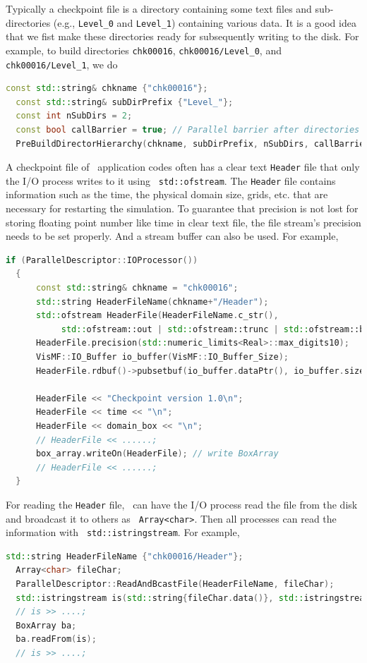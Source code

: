 {{Typically a checkpoint file is a directory containing some text files
and sub-directories (e.g., {\tt Level\_0} and {\tt Level\_1})
containing various data.  It is a good idea that we fist make these
directories ready for subsequently writing to the disk.  For example,
to build directories {\tt chk00016}, {\tt chk00016/Level\_0}, and {\tt
  chk00016/Level\_1}, we do
\begin{lstlisting}[language=cpp]
  const std::string& chkname {"chk00016"};
  const std::string& subDirPrefix {"Level_"};
  const int nSubDirs = 2;
  const bool callBarrier = true; // Parallel barrier after directories are built.
  PreBuildDirectorHierarchy(chkname, subDirPrefix, nSubDirs, callBarrier);
\end{lstlisting}

A checkpoint file of \amrex\ application codes often has a clear text
{\tt Header} file that only the I/O process writes to it using {\tt
std::ofstream}.  The {\tt Header} file contains information such as
the time, the physical domain size, grids, etc. that are necessary for
restarting the simulation.  To guarantee that precision is not lost
for storing floating point number like time in clear text file, the
file stream's precision needs to be set properly.  And a stream buffer
can also be used.  For example,
\begin{lstlisting}[language=cpp]
  if (ParallelDescriptor::IOProcessor())
  {
      const std::string& chkname = "chk00016";
      std::string HeaderFileName(chkname+"/Header");
      std::ofstream HeaderFile(HeaderFileName.c_str(),
           std::ofstream::out | std::ofstream::trunc | std::ofstream::binary);
      HeaderFile.precision(std::numeric_limits<Real>::max_digits10);
      VisMF::IO_Buffer io_buffer(VisMF::IO_Buffer_Size);
      HeaderFile.rdbuf()->pubsetbuf(io_buffer.dataPtr(), io_buffer.size());

      HeaderFile << "Checkpoint version 1.0\n";
      HeaderFile << time << "\n";
      HeaderFile << domain_box << "\n";
      // HeaderFile << ......;
      box_array.writeOn(HeaderFile); // write BoxArray
      // HeaderFile << ......;
  }
\end{lstlisting}
For reading the {\tt Header} file, \amrex\ can have the I/O process
read the file from the disk and broadcast it to others as {\tt
Array<char>}.  Then all processes can read the information with {\tt
std::istringstream}.  For example,
\begin{lstlisting}[language=cpp]
  std::string HeaderFileName {"chk00016/Header"};
  Array<char> fileChar;
  ParallelDescriptor::ReadAndBcastFile(HeaderFileName, fileChar);
  std::istringstream is(std::string{fileChar.data()}, std::istringstream::in);
  // is >> ....;
  BoxArray ba;
  ba.readFrom(is);
  // is >> ....;
\end{lstlisting}

}}
